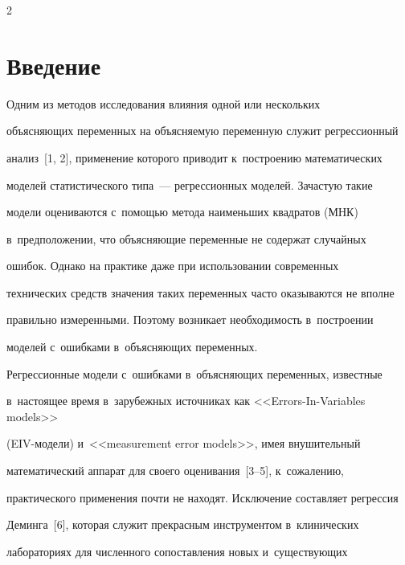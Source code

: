 \begin{multicols}{2}





\label{st\stat}


     


     


\section{Введение}





    Одним из методов исследования влияния одной или нескольких 


объясняющих переменных на объясняемую переменную служит регрессионный 


анализ~[1, 2], применение которого приводит к~построению математических 


моделей статистического типа~--- регрессионных моделей. За\-час\-тую такие\linebreak 


модели оцениваются с~помощью метода наименьших квадратов (МНК) 


в~предположении, что объясняющие переменные не содержат случайных 


ошибок. Однако на практике даже при использовании современных 


технических средств значения таких переменных часто оказываются не вполне 


правильно измеренными. Поэтому возникает необходимость в~построении 


моделей с~ошибками в~объясняющих переменных.


    


    Регрессионные модели с~ошибками в~объясняющих переменных, известные 


в~настоящее время в~зарубежных источниках как <<Errors-In-Variables models>>  


(EIV-модели) и~<<measurement error models>>, имея внушительный 


математический аппарат для своего оценивания~[3--5], к~сожалению, 


практического применения почти не находят. Исключение составляет регрессия 


Деминга~[6], которая служит прекрасным инструментом в~клинических 


лабораториях для численного сопоставления новых и~существующих 



\end{multicols}
